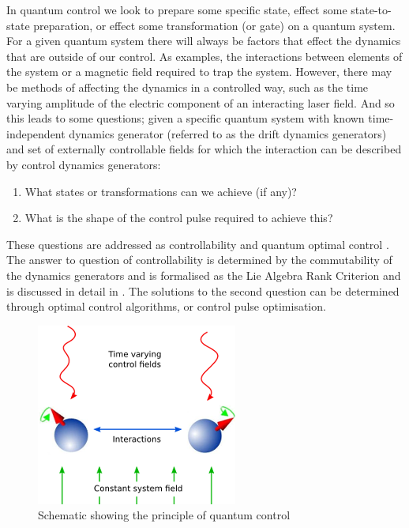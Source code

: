 \documentclass[12pt]{report}
\begin{document}
In quantum control we look to prepare some specific state, effect some state-to-state preparation, or effect some transformation (or gate) on a quantum system. 
For a given quantum system there will always be factors that effect the dynamics that are outside of our control. As examples, the interactions between elements of the system or a magnetic field required to trap the system. 
However, there may be methods of affecting the dynamics in a controlled way, such as the time varying amplitude of the electric component of an interacting laser field. 
And so this leads to some questions; given a specific quantum system with known time-independent dynamics generator (referred to as the drift dynamics generators) and set of externally controllable fields for which the interaction can be described by control dynamics generators:
\begin{enumerate}
    \item What states or transformations can we achieve (if any)?
    \item What is the shape of the control pulse required to achieve this?
\end{enumerate}
These questions are addressed as controllability and quantum optimal control \cite{d2021introduction}. The answer to question of controllability is determined by the commutability of the dynamics generators and is formalised as the Lie Algebra Rank Criterion and is discussed in detail in \cite{d2021introduction}. 
The solutions to the second question can be determined through optimal control algorithms, or control pulse optimisation.

\begin{figure}[H]
    \centering
    \includegraphics[width=0.5\linewidth]{principles_quantum_control.png}
    \caption{Schematic showing the principle of quantum control\cite{Johansson2013}}
    \label{fig:principles_quantum_control}
\end{figure}
\end{document}
